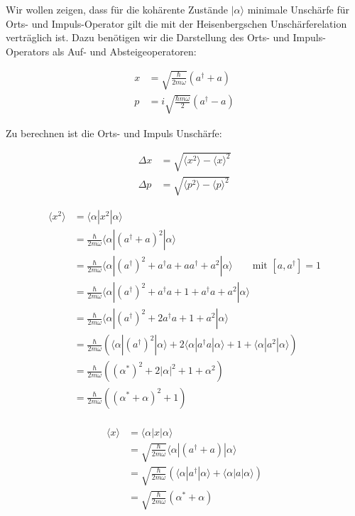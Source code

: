 Wir wollen zeigen, dass für die kohärente Zustände \(|\alpha\rangle \) minimale Unschärfe für Orts- und Impuls-Operator gilt die mit der Heisenbergschen Unschärferelation verträglich ist. Dazu benötigen wir die Darstellung des  Orts- und Impuls-Operators als Auf- und Absteigeoperatoren:

\begin{align}
  x &= \sqrt{ \frac{\hbar}{2m\omega}} (a^\dagger+a)\\ \label{eq:11}
  p &= i\sqrt{ \frac{\hbar m\omega}{2}} (a^\dagger-a) \label{eq:12}
\end{align}

Zu berechnen ist die Orts- und Impuls Unschärfe:

\begin{align}
  \Delta x &= \sqrt{ \langle x^2\rangle -\langle x\rangle^2 }\label{eq:13}\\
   \Delta p &= \sqrt{ \langle p^2\rangle -\langle p\rangle^2 }\label{eq:14}
\end{align}


\begin{align}
  \label{eq:15}
  \langle x^2\rangle &= \langle \alpha|x^2|\alpha\rangle \\
  &= \frac{\hbar}{2m\omega}\langle \alpha|(a^\dagger + a)^2|\alpha\rangle\\
  &= \frac{\hbar}{2m\omega}\langle \alpha|(a^\dagger)^2 + a^\dagger a+aa^\dagger +a^2|\alpha\rangle \qquad \text{mit } [a,a^\dagger] = 1\\
   &= \frac{\hbar}{2m\omega}\langle \alpha|(a^\dagger)^2 + a^\dagger a+1+a^\dagger a +a^2|\alpha\rangle\\
   &= \frac{\hbar}{2m\omega}\langle \alpha|(a^\dagger)^2 + 2 a^\dagger a+1 +a^2|\alpha\rangle\\
   &= \frac{\hbar}{2m\omega}\left(\langle \alpha|(a^\dagger)^2|\alpha\rangle + 2\langle \alpha| a^\dagger a|\alpha\rangle+ 1 +\langle \alpha| a^2|\alpha\rangle\right)\\
   &= \frac{\hbar}{2m\omega}\left((\alpha^*)^2 + 2| \alpha|^2 + 1 + \alpha^2\right)\\
   &= \frac{\hbar}{2m\omega}\left((\alpha^*+\alpha)^2 + 1\right)\\
\end{align}

\begin{align}
  \label{eq:16}
   \langle x\rangle &= \langle \alpha|x|\alpha\rangle \\
 &= \sqrt{ \frac{\hbar}{2m\omega}}\langle \alpha|(a^\dagger + a)|\alpha\rangle\\
 &= \sqrt{\frac{\hbar}{2m\omega}}(\langle \alpha|a^\dagger|\alpha\rangle +\langle \alpha| a|\alpha\rangle)\\
 &= \sqrt{\frac{\hbar}{2m\omega}}(\alpha^* + \alpha)\\
\end{align}

